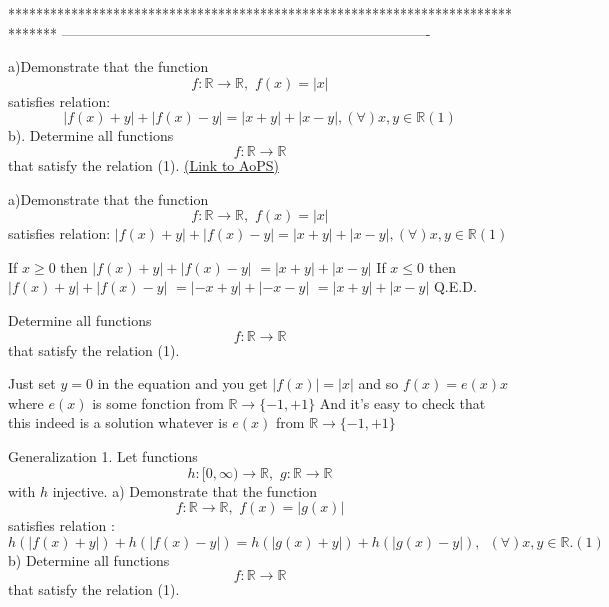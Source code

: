*******************************************************************************
-------------------------------------------------------------------------------

\begin{problem}
	a)Demonstrate that the function \[f:\mathbb{R}\to \mathbb{R},\,\,f(x)=\left| x \right|\] satisfies relation:
   \[\left| f(x)+y \right|+\left| f(x)-y \right|=\left| x+y \right|+\left| x-y \right|,\left( \forall  \right)x,y\in \mathbb{R}(1)\]                                                     
 b). Determine all functions \[f:\mathbb{R}\to \mathbb{R}\] that satisfy the relation (1).
	\flushright \href{https://artofproblemsolving.com/community/c6h489991}{(Link to AoPS)}
\end{problem}



\begin{solution}
	\begin{tcolorbox}a)Demonstrate that the function \[f:\mathbb{R}\to \mathbb{R},\,\,f(x)=\left| x \right|\] satisfies relation:
$\left| f(x)+y \right|+\left| f(x)-y \right|=\left| x+y \right|+\left| x-y \right|,\left( \forall  \right)x,y\in \mathbb{R}(1)$                                                 \end{tcolorbox}
If $x\ge 0$ then $| f(x)+y|+| f(x)-y |$ $=| x+y|+|x-y |$ 
If $x\le 0$ then $| f(x)+y|+| f(x)-y |$ $=|- x+y|+|-x-y |$ $=| x+y|+|x-y |$ 
Q.E.D.

\begin{tcolorbox}Determine all functions \[f:\mathbb{R}\to \mathbb{R}\] that satisfy the relation (1).\end{tcolorbox}
Just set $y=0$ in the equation and you get $|f(x)|=|x|$ and so $f(x)=e(x)x$ where $e(x)$ is some fonction from $\mathbb R\to\{-1,+1\}$
And it's easy to check that this indeed is a solution whatever is $e(x)$ from $\mathbb R\to\{-1,+1\}$
\end{solution}



\begin{solution}
	Generalization 1.
Let functions \[h:[0,\infty )\to \mathbb{R},\,\,g:\mathbb{R}\to \mathbb{R}\] with $h$ injective.
 a) Demonstrate that the function \[f:\mathbb{R}\to \mathbb{R},\,\,f(x)=\left| g(x) \right|\] satisfies relation :
   \[h\left( \left| f(x)+y \right| \right)+h\left( \left| f(x)-y \right| \right)=h\left( \left| g(x)+y \right| \right)+h\left( \left| g(x)-y \right| \right),\,\,\,\left( \forall  \right)x,y\in \mathbb{R}. (1)\]
b) Determine all functions \[f:\mathbb{R}\to \mathbb{R}\] that satisfy the relation (1).
\end{solution}



